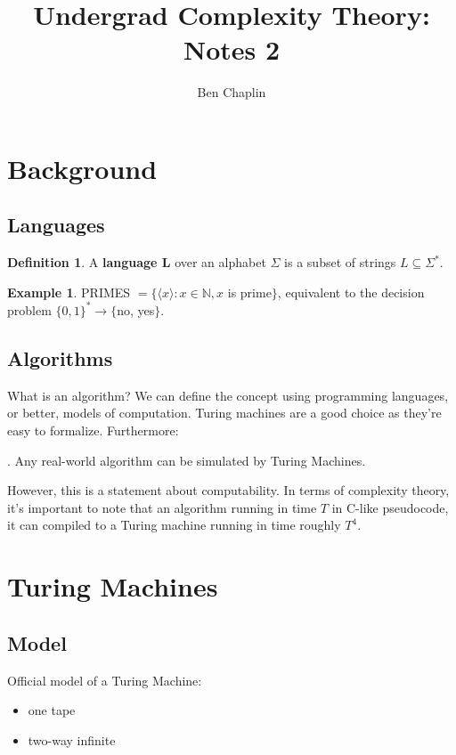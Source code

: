 \documentclass[11pt]{article}
\title{Undergrad Complexity Theory: Notes 2}
\author{Ben Chaplin}
\date{}
\theoremstyle{plain}
\theoremstyle{definition}
\newtheorem*{defn}{Definition}
\newtheorem*{ex}{Example}
\newcommand{\N}{\mathbb{N}}
\begin{document}
\maketitle
\tableofcontents

\section{Background}
\subsection{Languages}

\begin{defn}
	A {\bf language L} over an alphabet $\Sigma$ is a subset of strings $L \subseteq \Sigma^*$.
\end{defn}

\begin{ex}
	PRIMES $= \{\langle x \rangle : x \in \N, x$ is prime$\}$, equivalent to the decision problem $\{0, 1\}^* \rightarrow \{$no, yes$\}$.
\end{ex}

\subsection{Algorithms}

What is an algorithm? We can define the concept using programming languages, or better, models of computation. Turing machines are
a good choice as they're easy to formalize. Furthermore: \medskip

. Any real-world algorithm can be simulated by Turing Machines.\medskip

However, this is a statement about computability. In terms of complexity theory, it's important to note that an algorithm running in
time $T$ in C-like pseudocode, it can compiled to a Turing machine running in time roughly $T^4$.

\section{Turing Machines}
\subsection{Model}

Official model of a Turing Machine:
\begin{itemize}
	\item one tape
	\item two-way infinite
\end{itemize}
\end{document}
